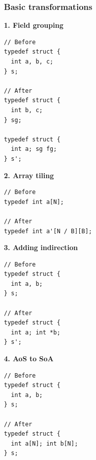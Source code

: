 \begin{frame}[fragile]
\frametitle{Basic transformations}

\begin{center}
\begin{minipage}{0.45\linewidth}
\textbf{\small 1. Field grouping}
\begin{lstlisting}[style=Cstyle, basicstyle=\scriptsize]
// Before
typedef struct {
  int a, b, c;
} s;

// After
typedef struct {
  int b, c;
} sg;

typedef struct {
  int a; sg fg;
} s';
\end{lstlisting}
\textbf{\small 2. Array tiling}
\begin{lstlisting}[style=Cstyle, basicstyle=\scriptsize]
// Before
typedef int a[N];

// After
typedef int a'[N / B][B];
\end{lstlisting}
\end{minipage}%
\begin{minipage}{0.45\linewidth}
\textbf{\small 3. Adding indirection}
\begin{lstlisting}[style=Cstyle, basicstyle=\scriptsize]
// Before
typedef struct {
  int a, b;
} s;

// After
typedef struct {
  int a; int *b;
} s';
\end{lstlisting}
\textbf{\small 4. AoS to SoA}
\begin{lstlisting}[style=Cstyle, basicstyle=\scriptsize]
// Before
typedef struct {
  int a, b;
} s;

// After
typedef struct {
  int a[N]; int b[N];
} s;
\end{lstlisting}
\end{minipage}
\end{center}

\end{frame}


